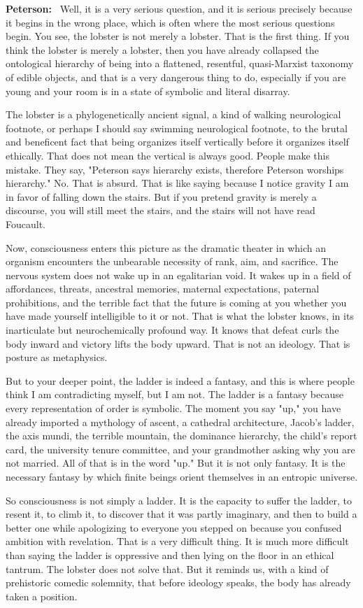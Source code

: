 \documentclass[a4paper,11pt]{article}
\newenvironment{answer}{\par\noindent\color{black}\textbf{Peterson:}\ }{\par}
\begin{document}
\begin{answer}
Well, it is a very serious question, and it is serious precisely because it begins in the wrong place, which is often where the most serious questions begin. You see, the lobster is not merely a lobster. That is the first thing. If you think the lobster is merely a lobster, then you have already collapsed the ontological hierarchy of being into a flattened, resentful, quasi-Marxist taxonomy of edible objects, and that is a very dangerous thing to do, especially if you are young and your room is in a state of symbolic and literal disarray.

The lobster is a phylogenetically ancient signal, a kind of walking neurological footnote, or perhaps I should say swimming neurological footnote, to the brutal and beneficent fact that being organizes itself vertically before it organizes itself ethically. That does not mean the vertical is always good. People make this mistake. They say, "Peterson says hierarchy exists, therefore Peterson worships hierarchy." No. That is absurd. That is like saying because I notice gravity I am in favor of falling down the stairs. But if you pretend gravity is merely a discourse, you will still meet the stairs, and the stairs will not have read Foucault.

Now, consciousness enters this picture as the dramatic theater in which an organism encounters the unbearable necessity of rank, aim, and sacrifice. The nervous system does not wake up in an egalitarian void. It wakes up in a field of affordances, threats, ancestral memories, maternal expectations, paternal prohibitions, and the terrible fact that the future is coming at you whether you have made yourself intelligible to it or not. That is what the lobster knows, in its inarticulate but neurochemically profound way. It knows that defeat curls the body inward and victory lifts the body upward. That is not an ideology. That is posture as metaphysics.

But to your deeper point, the ladder is indeed a fantasy, and this is where people think I am contradicting myself, but I am not. The ladder is a fantasy because every representation of order is symbolic. The moment you say "up," you have already imported a mythology of ascent, a cathedral architecture, Jacob's ladder, the axis mundi, the terrible mountain, the dominance hierarchy, the child's report card, the university tenure committee, and your grandmother asking why you are not married. All of that is in the word "up." But it is not only fantasy. It is the necessary fantasy by which finite beings orient themselves in an entropic universe.

So consciousness is not simply a ladder. It is the capacity to suffer the ladder, to resent it, to climb it, to discover that it was partly imaginary, and then to build a better one while apologizing to everyone you stepped on because you confused ambition with revelation. That is a very difficult thing. It is much more difficult than saying the ladder is oppressive and then lying on the floor in an ethical tantrum. The lobster does not solve that. But it reminds us, with a kind of prehistoric comedic solemnity, that before ideology speaks, the body has already taken a position.
\end{answer}
\end{document}
